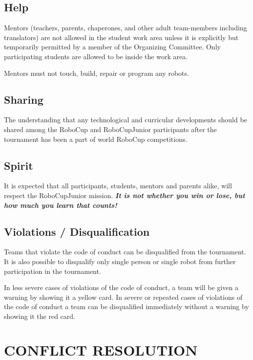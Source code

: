 \documentclass{article}
\begin{document}
\subsection{ Help \label{ref-043}}

Mentors (teachers, parents, chaperones, and other adult team-members including
translators) are not allowed in the student work area unless it is explicitly
but temporarily permitted by a member of the Organizing Committee. Only
participating students are allowed to be inside the work area.

Mentors must not touch, build, repair or program any robots.

\subsection{ Sharing \label{ref-044}}

The understanding that any technological and curricular developments should be
shared among the RoboCup and RoboCupJunior participants after the tournament
has been a part of world RoboCup competitions.

\subsection{ Spirit \label{ref-045}}

It is expected that all participants, students, mentors and parents alike, will
respect the RoboCupJunior mission. \textbf{\textit{It is not whether you win or
lose, but how much you learn that counts!}}

\subsection{ Violations / Disqualification \label{ref-046}}

Teams that violate the code of conduct can be disqualified from the tournament.
It is also possible to disqualify only single person or single robot from
further participation in the tournament.

In less severe cases of violations of the code of conduct, a team will be given
a warning by showing it a yellow card. In severe or repeated cases of
violations of the code of conduct a team can be disqualified immediately
without a warning by showing it the red card.

\section{CONFLICT RESOLUTION \label{ref-047}}
\end{document}
